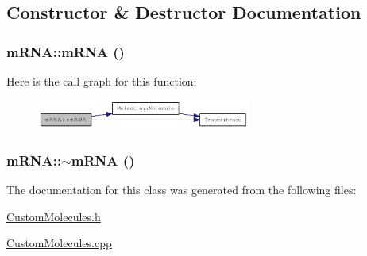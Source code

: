 \subsection{Constructor \& Destructor Documentation}
\hypertarget{classmRNA_add6fc6ce355527cdab338afb3c9a118f}{
\subsubsection[{mRNA}]{\setlength{\rightskip}{0pt plus 5cm}mRNA::mRNA ()}}
\label{classmRNA_add6fc6ce355527cdab338afb3c9a118f}


Here is the call graph for this function:\nopagebreak
\begin{figure}[H]
\begin{center}
\leavevmode
\includegraphics[width=199pt]{classmRNA_add6fc6ce355527cdab338afb3c9a118f_cgraph}
\end{center}
\end{figure}
\hypertarget{classmRNA_a31f5c877c9941cee8d9f991c8e40b8ec}{
\subsubsection[{$\sim$mRNA}]{\setlength{\rightskip}{0pt plus 5cm}mRNA::$\sim$mRNA ()}}
\label{classmRNA_a31f5c877c9941cee8d9f991c8e40b8ec}


The documentation for this class was generated from the following files:\begin{DoxyCompactItemize}
\item 
\hyperlink{CustomMolecules_8h}{CustomMolecules.h}\item 
\hyperlink{CustomMolecules_8cpp}{CustomMolecules.cpp}\end{DoxyCompactItemize}
